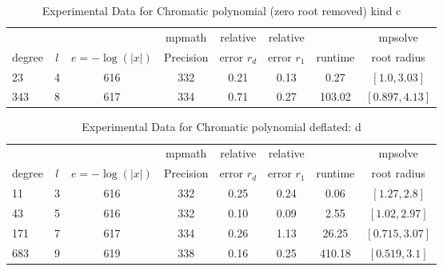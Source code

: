 \documentclass[sigconf]{acmart}
\begin{document}
\begin{table}[t]
\caption{Experimental Data for Chromatic polynomial (zero root removed) kind c}
\label{tab:chrmc}
\vskip -0.15in
\begin{center}
\begin{small}
\begin{sc}
\begin{tabular}{lccccccc}
\toprule
&  &  & mpmath & relative  & relative &  & mpsolve \\
degree  & $l$& $e=-\log(|x|)$& Precision &error $r_d$       & error $r_1$ &runtime& root radius\\
\midrule
 23   & 4 & 616 & 332 & 0.21 & 0.13 & 0.27 & $[1.0, 3.03]$ \\
 343 & 8 & 617 & 334 & 0.71 & 0.27 & 103.02 & $[0.897, 4.13]$\\
\bottomrule
\end{tabular}
\end{sc}
\end{small}
\end{center}
\vskip 0.05in
\end{table}


\begin{table}[t]
\caption{Experimental Data for Chromatic polynomial deflated: d}
\label{tab:chrmc_d}
\vskip -0.15in
\begin{center}
\begin{small}
\begin{sc}
\begin{tabular}{lccccccc}
\toprule
&  &  & mpmath & relative  & relative &  & mpsolve \\
degree  & $l$& $e=-\log(|x|)$& Precision &error $r_d$       & error $r_1$ &runtime& root radius\\
\midrule
   11 & 3 & 616 & 332 & 0.25 & 0.24 & 0.06     & $[1.27, 2.8]$ \\
   43 & 5 & 616 & 332 & 0.10 & 0.09 & 2.55     & $[1.02, 2.97]$\\
 171 & 7 & 617 & 334 & 0.26 & 1.13 & 26.25   & $[0.715, 3.07]$\\
 683 & 9 & 619 & 338 & 0.16 & 0.25 & 410.18 & $[0.519, 3.1]$\\
\bottomrule
\end{tabular}
\end{sc}
\end{small}
\end{center}
\vskip 0.05in
\end{table}
\end{document}
